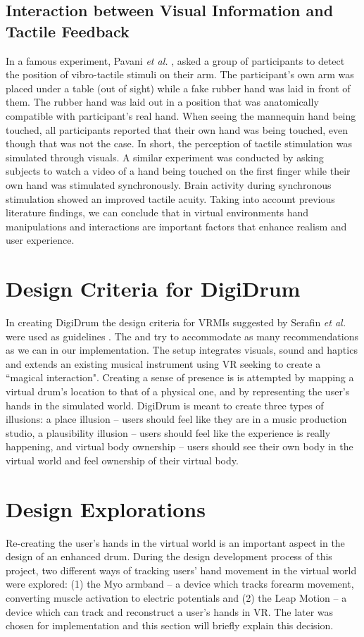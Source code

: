 \documentclass{article}
\begin{document}
\subsection{Interaction between Visual Information and Tactile Feedback}
In a famous experiment, Pavani \emph{et al.} \cite{Pavani2000},  asked a group of participants to detect the position of vibro-tactile stimuli on their arm. The participant's own arm was placed under a table (out of sight) while a fake rubber hand was laid in front of them. The rubber hand was laid out in a position that was anatomically compatible with participant's real hand. When seeing the mannequin hand being touched, all participants reported that their own hand was being touched, even though that was not the case. In short, the perception of tactile stimulation was simulated through visuals. A similar experiment was conducted by \cite{Schaefer2006} asking subjects to watch a video of a hand being touched on the first finger while their own hand was stimulated synchronously. Brain activity during synchronous stimulation showed an improved tactile acuity. Taking into account previous literature findings, we can conclude that in virtual environments hand manipulations and interactions are important factors that enhance realism and user experience. 


\section{Design Criteria for DigiDrum}\label{sec:Design_criteria}

In creating DigiDrum the design criteria for VRMIs suggested by Serafin \emph{et al.} were used as guidelines \cite{Serafin:2016}. The  and try to accommodate as many recommendations as we can in our implementation. The setup integrates visuals, sound and haptics and extends an existing musical instrument using VR seeking to create a ``magical interaction". Creating a sense of presence is is attempted by mapping a virtual drum's location to that of a physical one, and by representing the user's hands in the simulated world. DigiDrum is meant to create three types of illusions: a place illusion -- users should feel like they are in a music production studio, a plausibility illusion -- users should feel like the experience is really happening, and virtual body ownership -- users should see their own body in the virtual world and feel ownership of their virtual body.

\section{Design Explorations}\label{sec:desex}
Re-creating the user's hands in the virtual world is an important aspect in the design of an enhanced drum. During the design development process of this project, two different ways of tracking users' hand movement in the virtual world were explored: (1) the Myo armband -- a device which tracks forearm movement, converting muscle activation to electric potentials and (2) the Leap Motion -- a device which can track and reconstruct a user's hands in VR. The later was chosen for implementation and this section will briefly explain this decision. 
\end{document}
